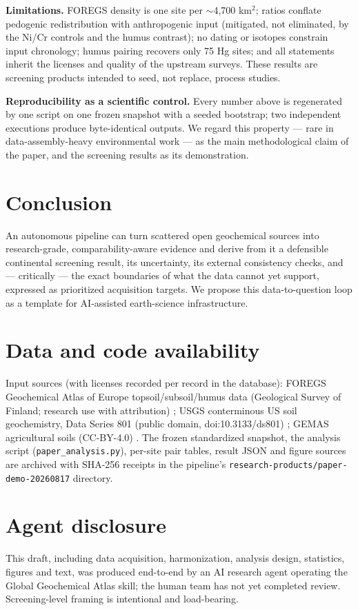 \documentclass[11pt]{article}
\begin{document}
\textbf{Limitations.} FOREGS density is one site per $\sim$4{,}700 km$^2$;
ratios conflate pedogenic redistribution with anthropogenic input (mitigated,
not eliminated, by the Ni/Cr controls and the humus contrast); no dating or
isotopes constrain input chronology; humus pairing recovers only 75 Hg sites;
and all statements inherit the licenses and quality of the upstream surveys.
These results are screening products intended to seed, not replace,
process studies.

\textbf{Reproducibility as a scientific control.} Every number above is
regenerated by one script on one frozen snapshot with a seeded bootstrap;
two independent executions produce byte-identical outputs. We regard this
property --- rare in data-assembly-heavy environmental work --- as the main
methodological claim of the paper, and the screening results as its
demonstration.

\section{Conclusion}
An autonomous pipeline can turn scattered open geochemical sources into
research-grade, comparability-aware evidence and derive from it a defensible
continental screening result, its uncertainty, its external consistency
checks, and --- critically --- the exact boundaries of what the data cannot yet
support, expressed as prioritized acquisition targets. We propose this
data-to-question loop as a template for AI-assisted earth-science
infrastructure.

\section*{Data and code availability}
Input sources (with licenses recorded per record in the database):
FOREGS Geochemical Atlas of Europe topsoil/subsoil/humus data
(Geological Survey of Finland; research use with attribution)
\cite{salminen2005,devos2006};
USGS conterminous US soil geochemistry, Data Series 801 (public domain,
doi:10.3133/ds801) \cite{smith2013};
GEMAS agricultural soils (CC-BY-4.0) \cite{reimann2014}.
The frozen standardized snapshot, the analysis script
(\texttt{paper\_analysis.py}), per-site pair tables, result JSON and figure
sources are archived with SHA-256 receipts in the pipeline's
\texttt{research-products/paper-demo-20260817} directory.

\section*{Agent disclosure}
This draft, including data acquisition, harmonization, analysis design,
statistics, figures and text, was produced end-to-end by an AI research agent
operating the Global Geochemical Atlas skill; the human team has not yet
completed review. Screening-level framing is intentional and load-bearing.
\end{document}
